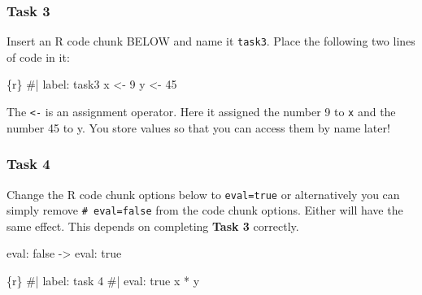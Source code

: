 \documentclass[
  letterpaper,
  DIV=11,
  numbers=noendperiod]{scrreprt}
\newenvironment{Shaded}{\begin{snugshade}}{\end{snugshade}}
\newcommand{\CommentTok}[1]{\textcolor[rgb]{0.37,0.37,0.37}{#1}}
\newcommand{\DecValTok}[1]{\textcolor[rgb]{0.68,0.00,0.00}{#1}}
\newcommand{\InformationTok}[1]{\textcolor[rgb]{0.37,0.37,0.37}{#1}}
\newcommand{\NormalTok}[1]{\textcolor[rgb]{0.00,0.23,0.31}{#1}}
\newcommand{\OtherTok}[1]{\textcolor[rgb]{0.00,0.23,0.31}{#1}}
\newcommand{\SpecialCharTok}[1]{\textcolor[rgb]{0.37,0.37,0.37}{#1}}
\begin{document}
\hypertarget{task-3}{%
\subsubsection*{Task 3}\label{task-3}}

Insert an R code chunk BELOW and name it \texttt{task3}. Place the
following two lines of code in it:

\begin{tcolorbox}[enhanced jigsaw, colframe=quarto-callout-important-color-frame, breakable, colback=white, toprule=.15mm, leftrule=.75mm, left=2mm, opacityback=0, rightrule=.15mm, arc=.35mm, bottomrule=.15mm]

\begin{Shaded}
\begin{Highlighting}[]
\InformationTok{\textasciigrave{}\textasciigrave{}\textasciigrave{}\{r\}}
\CommentTok{\#| label: task3}
\NormalTok{x }\OtherTok{\textless{}{-}} \DecValTok{9}
\NormalTok{y }\OtherTok{\textless{}{-}} \DecValTok{45}
\InformationTok{\textasciigrave{}\textasciigrave{}\textasciigrave{}}
\end{Highlighting}
\end{Shaded}

\end{tcolorbox}

The \texttt{\textless{}-} is an assignment operator. Here it assigned
the number 9 to \texttt{x} and the number 45 to y. You store values so
that you can access them by name later!

\hypertarget{task-4}{%
\subsubsection*{Task 4}\label{task-4}}

Change the R code chunk options below to \texttt{eval=true} or
alternatively you can simply remove \texttt{\#\textbar{}\ eval=false}
from the code chunk options. Either will have the same effect. This
depends on completing \textbf{Task 3} correctly.

\begin{tcolorbox}[enhanced jigsaw, colframe=quarto-callout-important-color-frame, breakable, colback=white, toprule=.15mm, leftrule=.75mm, left=2mm, opacityback=0, rightrule=.15mm, arc=.35mm, bottomrule=.15mm]
eval: false -\textgreater{} eval: true
\end{tcolorbox}

\begin{Shaded}
\begin{Highlighting}[]
\InformationTok{\textasciigrave{}\textasciigrave{}\textasciigrave{}\{r\}}
\CommentTok{\#| label: task 4}
\CommentTok{\#| eval: true}
\NormalTok{x }\SpecialCharTok{*}\NormalTok{ y}
\InformationTok{\textasciigrave{}\textasciigrave{}\textasciigrave{}}
\end{Highlighting}
\end{Shaded}
\end{document}
